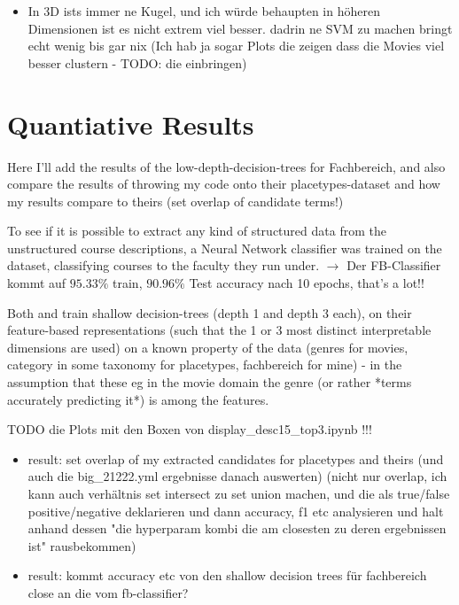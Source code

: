 \begin{itemize}
	\item In 3D ists immer ne Kugel, und ich würde behaupten in höheren Dimensionen ist es nicht extrem viel besser. dadrin ne SVM zu machen bringt echt wenig bis gar nix (Ich hab ja sogar Plots die zeigen dass die Movies viel besser clustern - TODO: die einbringen)
\end{itemize}


\section{Quantiative Results}


Here I'll add the results of the low-depth-decision-trees for Fachbereich, and also compare the results of throwing my code onto their placetypes-dataset and how my results compare to theirs 
(set overlap of candidate terms!)

To see if it is possible to extract any kind of structured data from the unstructured course descriptions, a Neural Network classifier was trained on the dataset, classifying courses to the faculty they run under. 
$\rightarrow$ Der FB-Classifier kommt auf $95.33\%$ train, $90.96\%$ Test accuracy nach 10 epochs, that's a lot!!


Both \cite{Ager2018} and \cite{Alshaikh2020} train shallow decision-trees (depth 1 and depth 3 each), on their feature-based representations (such that the 1 or 3 most distinct interpretable dimensions are used) on a known property of the data (genres for movies, category in some taxonomy for placetypes, fachbereich for mine) - in the assumption that these eg in the movie domain the genre (or rather *terms accurately predicting it*) is among the features.


TODO die Plots mit den Boxen von display_desc15_top3.ipynb !!!

\begin{itemize}
	\item result: set overlap of my extracted candidates for placetypes and theirs (und auch die big_21222.yml ergebnisse danach auswerten) (nicht nur overlap, ich kann auch verhältnis set intersect zu set union machen, und die als true/false positive/negative deklarieren und dann accuracy, f1 etc analysieren und halt anhand dessen "die hyperparam kombi die am closesten zu deren ergebnissen ist" rausbekommen)
	\item result: kommt accuracy etc von den shallow decision trees für fachbereich close an die vom fb-classifier?
\end{itemize}